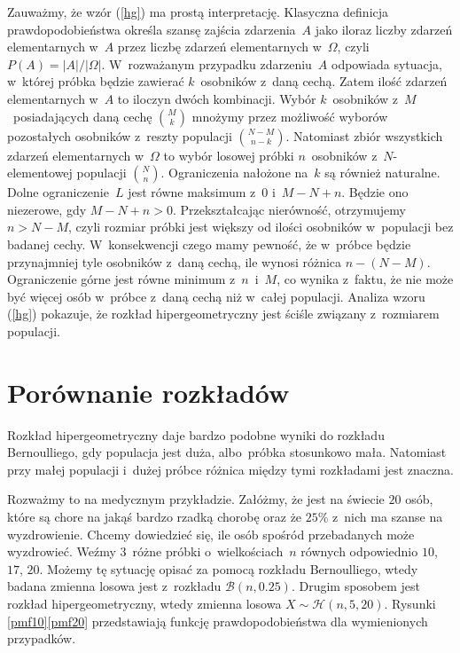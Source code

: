 Zauważmy, że wzór (\ref{hg}) ma prostą interpretację. Klasyczna definicja prawdopodobieństwa określa szansę zajścia zdarzenia~$A$ jako iloraz liczby zdarzeń elementarnych w~$A$ przez liczbę zdarzeń elementarnych w~$\Omega$, czyli $P(A) = |A|/|\Omega|$. W~rozważanym przypadku zdarzeniu~$A$ odpowiada sytuacja, w~której próbka będzie zawierać $k$~osobników z~daną cechą. Zatem ilość zdarzeń elementarnych w~$A$ to iloczyn dwóch kombinacji. Wybór $k$~osobników z~$M$~posiadających daną cechę $\binom{M}{k}$ mnożymy przez możliwość wyborów pozostałych osobników z~reszty populacji $\binom{N-M}{n-k}$. Natomiast zbiór wszystkich zdarzeń elementarnych w~$\Omega$ to wybór losowej próbki $n$~osobników z~$N$-elementowej populacji $\binom{N}{n}$. Ograniczenia nałożone na~$k$ są również naturalne. Dolne ograniczenie~$L$ jest równe maksimum z~$0$ i~$M-N+n$. Będzie ono niezerowe, gdy $M-N+n>0$. Przekształcając nierówność, otrzymujemy $n>N-M$, czyli rozmiar próbki jest większy od ilości osobników w~populacji bez badanej cechy. W~konsekwencji czego mamy pewność, że w~próbce będzie przynajmniej tyle osobników z~daną cechą, ile wynosi różnica $n-(N-M)$. Ograniczenie górne jest równe minimum z~$n$~i~$M$, co wynika z~faktu, że nie może być więcej osób w~próbce z~daną cechą niż w~całej populacji. Analiza wzoru (\ref{hg}) pokazuje, że rozkład hipergeometryczny jest ściśle związany z~rozmiarem populacji.

\section{Porównanie rozkładów}

Rozkład hipergeometryczny daje bardzo podobne wyniki do rozkładu Bernoulliego, gdy populacja jest duża, albo~próbka stosunkowo mała. Natomiast przy małej populacji i~dużej próbce różnica między tymi rozkładami jest znaczna.

Rozważmy to na medycznym przykładzie. Załóżmy, że jest na świecie $20$ osób, które są chore na jakąś bardzo rzadką chorobę oraz że $25\%$ z~nich ma szanse na wyzdrowienie. Chcemy dowiedzieć się, ile osób spośród przebadanych może wyzdrowieć. Weźmy $3$~różne próbki o~wielkościach~$n$ równych odpowiednio $10$, $17$, $20$. Możemy tę sytuację opisać za pomocą rozkładu Bernoulliego, wtedy badana zmienna losowa jest z~rozkładu $\mathcal{B}(n,0.25)$. Drugim sposobem jest rozkład hipergeometryczny, wtedy zmienna losowa $X\sim\mathcal{H}(n,5,20)$. Rysunki \ref{pmf10}\ppauza\ref{pmf20} przedstawiają funkcję prawdopodobieństwa dla wymienionych przypadków.

